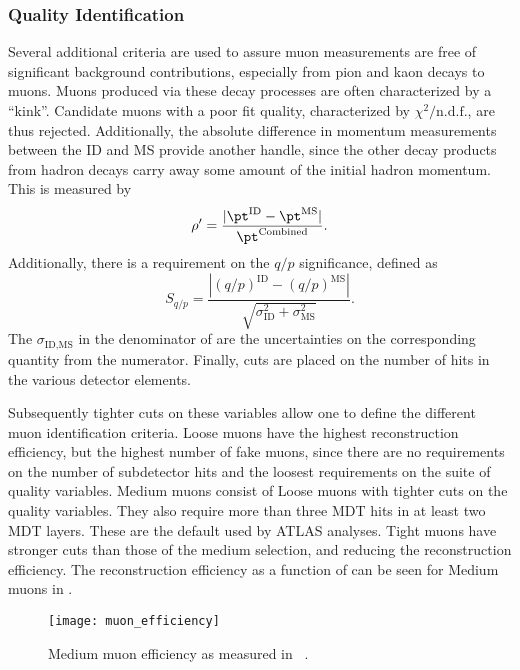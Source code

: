 \subsubsection{Quality Identification}

Several additional criteria are used to assure muon measurements are free of significant background contributions, especially from pion and kaon decays to muons.
Muons produced via these decay processes are often characterized by a ``kink''.
Candidate muons with a poor fit quality, characterized by $\chi^2/\text{n.d.f.}$, are thus rejected.
Additionally, the absolute difference in momentum measurements between the ID and MS provide another handle, since the other decay products from hadron decays carry away some amount of the initial hadron momentum.
This is measured by
\begin{equation}
\rho' = \frac{|\pt^{\text{ID}} - \pt^{\text{MS}} |}{\pt^{\text{Combined}}}.
\end{equation}
Additionally, there is a requirement on the $q/p$ significance, defined as
\begin{equation}\label{eq:muon_sig}
S_{q/p} = \frac{|(q/p)^{\text{ID}} - (q/p)^{\text{MS}} |}{\sqrt{\sigma_{\text{ID}}^2 + \sigma_{\text{MS}}^2  }}.
\end{equation}
The $\sigma_{\text{ID,MS}}$ in the denominator of  are the uncertainties on the corresponding quantity from the numerator.
Finally, cuts are placed on the number of hits in the various detector elements.

Subsequently tighter cuts on these variables allow one to define the different muon identification criteria.
Loose muons have the highest reconstruction efficiency, but the highest number of fake muons, since there are no requirements on the number of subdetector hits and the loosest requirements on the suite of quality variables.
Medium muons consist of Loose muons with tighter cuts on the quality variables.
They also require more than three MDT hits in at least two MDT layers.
These are the default used by ATLAS analyses.
Tight muons have stronger cuts than those of the medium selection, and reducing the reconstruction efficiency.
The reconstruction efficiency as a function of \pt can be seen for Medium muons in .

\begin{figure}
\caption{Medium muon efficiency as measured in ~\cite{PERF-2015-10}.} \label{fig:muon_eff}
\texttt{[image: muon\_efficiency]}
\end{figure}

